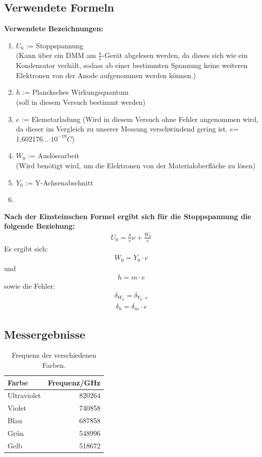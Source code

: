 \documentclass[12px]{scrartcl}
\begin{document}
\subsection{Verwendete Formeln}
\textbf{Verwendete Bezeichnungen:}
\begin{enumerate}
\item $U_0$ := Stoppspannung\\ (Kann über ein DMM am $\frac{h}{e}$-Gerät abgelesen werden, da dieses sich wie ein Kondensator verhält, sodass ab einer bestimmten Spannung keine weiteren Elektronen von der Anode aufgenommen werden können.)
\item $h$ := Plancksches Wirkungsquantum\\
(soll in diesem Versuch bestimmt werden)
\item $e$ := Elemetarladung
(Wird in diesem Versuch ohne Fehler angenommen wird, da dieser im Vergleich zu unserer Messung verschwindend gering ist. $e$= 1,602176...$\cdot10^{-19}C$)
\item $W_0$ := Auslösearbeit\\
(Wird benötigt wird, um die Elektronen von der Materialoberfläche zu lösen)
\item $Y_0$ := Y-Achsenabschnitt
\item

\end{enumerate}
\textbf{Nach der Einsteinschen Formel ergibt sich für die Stoppspannung die folgende Beziehung:}
\begin{align}
U_0 = \frac{h}{e}\nu + \frac{W_0}{e}
\label{enq:stop}
\end{align}
Es ergibt sich:
\begin{align}
W_0 = Y_0\cdot e
\end{align}
und
\begin{align}
h = m\cdot e
\end{align}
sowie die Fehler:
\begin{align}
\delta_{W_0} = \delta_{Y_0\cdot e}
\end{align}
\begin{align}
\delta_h = \delta_m\cdot e
\end{align}
\subsection{Messergebnisse}
\begin{table}[htbp]
\caption{Frequenz der verschiedenen Farben.}
\begin{center}
\begin{tabular}{|l|r|}
\hline
Farbe & \multicolumn{1}{l|}{Frequenz/GHz} \\ \hline
Ultraviolet & 820264 \\ \hline
Violet  & 740858 \\ \hline
Blau & 687858 \\ \hline
Grün & 548996 \\ \hline
Gelb & 518672 \\ \hline
\end{tabular}
\end{center}
\label{tab:frequenz}
\end{table}
\end{document}
